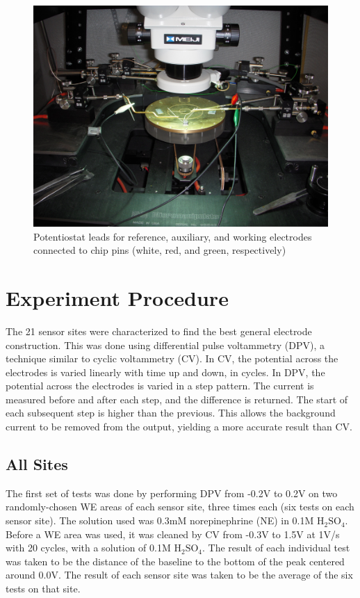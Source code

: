 \begin{figure}
	\centering
	\includegraphics[width=0.5\linewidth]{figures/potentiostatleads.png}
	\caption[Potentiostat leads connected to pins]{Potentiostat leads for reference, auxiliary, and working electrodes connected to chip pins (white, red, and green, respectively)}
	\label{potentiostatleads}
\end{figure}

\section{Experiment Procedure}

The 21 sensor sites were characterized to find the best general electrode construction. This was done using differential pulse voltammetry (DPV), a technique similar to cyclic voltammetry (CV). In CV, the potential across the electrodes is varied linearly with time up and down, in cycles. In DPV, the potential across the electrodes is varied in a step pattern. The current is measured before and after each step, and the difference is returned. The start of each subsequent step is higher than the previous. This allows the background current to be removed from the output, yielding a more accurate result than CV.

\subsection{All Sites}

The first set of tests was done by performing DPV from -0.2V to 0.2V on two randomly-chosen WE areas of each sensor site, three times each (six tests on each sensor site). The solution used was 0.3mM norepinephrine (NE) in 0.1M $\mathrm{H}_2\mathrm{SO}_4$. Before a WE area was used, it was cleaned by CV from -0.3V to 1.5V at 1V/s with 20 cycles, with a solution of 0.1M $\mathrm{H}_2\mathrm{SO}_4$. The result of each individual test was taken to be the distance of the baseline to the bottom of the peak centered around 0.0V. The result of each sensor site was taken to be the average of the six tests on that site.


